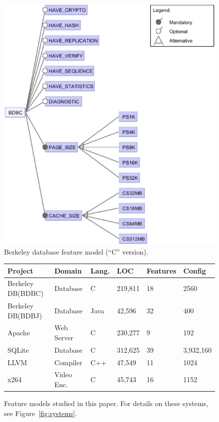 \documentclass{sig-alternative}
\newcommand{\fig}[1]{Figure~\ref{fig:#1}}
\begin{document}
\begin{figure}[!tb]
\includegraphics[width=0.95\linewidth]{Figures/BDBC.eps}
\caption{ Berkeley database feature model   (``C'' version). }\label{fig:bdbc}
\end{figure}
    


\begin{figure}[!tb]
\scriptsize
\begin{tabular}{llllll}
  \hline
Project & Domain & Lang. & LOC & Features & Config\\\hline
Berkeley DB(BDBC)   & Database & C & 219,811 & 18 & 2560\\
Berkeley DB(BDBJ)   & Database & Java & 42,596 & 32  & 400\\
Apache & Web Server & C & 230,277 & 9 & 192\\
SQLite & Database & C & 312,625 & 39 & 3,932,160\\
LLVM & Compiler & C++ & 47,549 & 11 & 1024\\
x264 & Video Enc. & C& 45,743 & 16 & 1152\\\hline
\end{tabular}
\caption{Feature models studied in this paper. For details on these systems,
see \fig{systems}.}
\label{fig:subjectsystems}
\end{figure}
\end{document}

